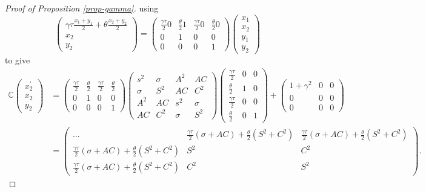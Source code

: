 \documentclass[
]{article}
\theoremstyle{definition}
\theoremstyle{definition}
\theoremstyle{definition}
\theoremstyle{definition}
\theoremstyle{remark}
\begin{document}
\begin{proof}[Proof of Proposition \ref{prop-gamma}]
using
\[
\left(\begin{array}{c}
\gamma\tau\frac{x_{1}+y_{1}}{2}+\theta\frac{x_{2}+y_{2}}{2}\\
x_{2}\\
y_{2}
\end{array}\right)=\left(\begin{array}{cccc}
\frac{\gamma\tau}{2}0 & \frac{\theta}{2}1 & \frac{\gamma\tau}{2}0 & \frac{\theta}{2}0\\
0 & 1 & 0 & 0\\
0 & 0 & 0 & 1
\end{array}\right)\left(\begin{array}{c}
x_{1}\\
x_{2}\\
y_{1}\\
y_{2}
\end{array}\right)
\]
to give
\begin{align*}
\mathbb{C}\left(\begin{array}{c}
x_{2}^{\prime}\\
x_{2}\\
y_{2}
\end{array}\right) & =\left(\begin{array}{cccc}
\frac{\gamma\tau}{2} & \frac{\theta}{2} & \frac{\gamma\tau}{2} & \frac{\theta}{2}\\
0 & 1 & 0 & 0\\
0 & 0 & 0 & 1
\end{array}\right)\left(\begin{array}{cccc}
s^{2} & \sigma & A^{2} & AC\\
\sigma & S^{2} & AC & C^{2}\\
A^{2} & AC & s^{2} & \sigma\\
AC & C^{2} & \sigma & S^{2}
\end{array}\right)\left(\begin{array}{ccc}
\frac{\gamma\tau}{2} & 0 & 0\\
\frac{\theta}{2} & 1 & 0\\
\frac{\gamma\tau}{2} & 0 & 0\\
\frac{\theta}{2} & 0 & 1
\end{array}\right)+\left(\begin{array}{ccc}
1+\gamma^{2} & 0 & 0\\
0 & 0 & 0\\
0 & 0 & 0
\end{array}\right)\\
 & =\left(\begin{array}{ccc}
\ldots & \frac{\gamma\tau}{2}(\sigma+AC)+\frac{\theta}{2}(S^{2}+C^{2}) & \frac{\gamma\tau}{2}(\sigma+AC)+\frac{\theta}{2}(S^{2}+C^{2})\\
\frac{\gamma\tau}{2}(\sigma+AC)+\frac{\theta}{2}(S^{2}+C^{2}) & S^{2} & C^{2}\\
\frac{\gamma\tau}{2}(\sigma+AC)+\frac{\theta}{2}(S^{2}+C^{2}) & C^{2} & S^{2}
\end{array}\right).
\end{align*}


\end{proof}
\end{document}
